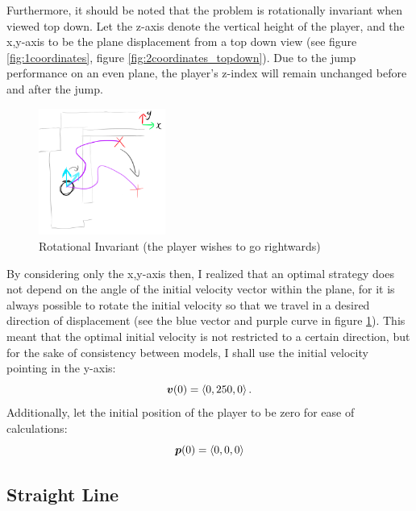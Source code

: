 Furthermore, it should be noted that the problem is rotationally invariant when viewed top down. Let the z-axis denote the vertical height of the player, and the x,y-axis to be the plane displacement from a top down view (see figure \ref{fig:1coordinates}, figure \ref{fig:2coordinates_topdown}). Due to the jump performance on an even plane, the player's z-index will remain unchanged before and after the jump.

\begin{figure}
    \includegraphics[width=0.37\textwidth,right]{assets/2turning.png}
    \caption{Rotational Invariant (the player wishes to go rightwards)}
    \label{fig:2turning}
\end{figure}

By considering only the x,y-axis then, I realized that an optimal strategy does not depend on the angle of the initial velocity vector within the plane, for it is always possible to rotate the initial velocity so that we travel in a desired direction of displacement (see the blue vector and purple curve in figure \ref{fig:2turning}). This meant that the optimal initial velocity is not restricted to a certain direction, but for the sake of consistency between models, I shall use the initial velocity pointing in the y-axis:
\[
    \boldsymbol{v}(0) = \left\langle 0, 250, 0 \right\rangle.
\]
Additionally, let the initial position of the player to be zero for ease of calculations:
\[
    \boldsymbol{p}(0) = \left\langle 0, 0, 0 \right\rangle
\]


\subsection{Straight Line}

